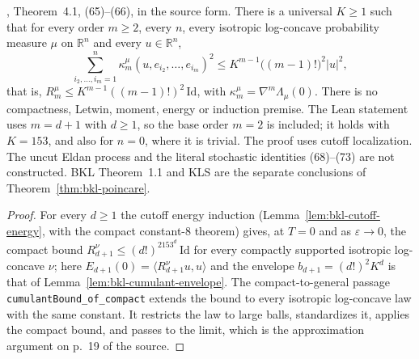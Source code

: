 \begin{theorem}
  \label{thm:bkl-cumulant-bound}
  \leanok
  \cite{BizeulKlartagLehec2026}, Theorem~4.1, (65)--(66), in the source form. There is a universal $K\ge1$ such that
  for every order $m\ge2$, every $n$, every isotropic log-concave probability measure $\mu$ on $\mathbb R^n$ and every
  $u\in\mathbb R^n$,
  \[
    \sum_{i_2,\dots,i_m=1}^n\kappa^\mu_m(u,e_{i_2},\dots,e_{i_m})^2\le K^{m-1}\bigl((m-1)!\bigr)^2|u|^2,
  \]
  that is, $R^\mu_m\le K^{m-1}((m-1)!)^2\,\mathrm{Id}$, with $\kappa^\mu_m=\nabla^m\Lambda_\mu(0)$. There is no
  compactness, Letwin, moment, energy or induction premise. The Lean statement uses $m=d+1$ with $d\ge1$, so the base
  order $m=2$ is included; it holds with $K=153$, and also for $n=0$, where it is trivial. The proof uses
  cutoff localization. The uncut Eldan process and the literal stochastic identities
  (68)--(73) are not constructed. BKL Theorem~1.1 and KLS are the separate conclusions of Theorem~\ref{thm:bkl-poincare}.
\end{theorem}
\begin{proof}
  \leanok
  For every $d\ge1$ the cutoff energy induction (Lemma~\ref{lem:bkl-cutoff-energy}, with the compact constant-8
  theorem) gives, at $T=0$ and as $\varepsilon\to0$, the compact bound $R^\nu_{d+1}\le(d!)^2153^d\,\mathrm{Id}$ for
  every compactly supported isotropic log-concave $\nu$; here $E_{d+1}(0)=\langle R^\nu_{d+1}u,u\rangle$ and the
  envelope $b_{d+1}=(d!)^2K^d$ is that of Lemma~\ref{lem:bkl-cumulant-envelope}. The compact-to-general passage
  \texttt{cumulantBound\_of\_compact} extends the bound to every isotropic log-concave law with the same constant. It
  restricts the law to large balls, standardizes it, applies the compact bound, and passes to the limit, which is the
  approximation argument on p.~19 of the source.
\end{proof}

